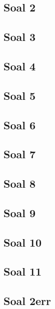 \documentclass[a4paper,12pt]{report}
\begin{document}
\subsection{Soal 2}

\subsection{Soal 3}

\subsection{Soal 4}

\subsection{Soal 5}

\subsection{Soal 6}

\subsection{Soal 7}

\subsection{Soal 8}

\subsection{Soal 9}

\subsection{Soal 10}

\subsection{Soal 11}

\subsection{Soal 2err}

\end{document}
